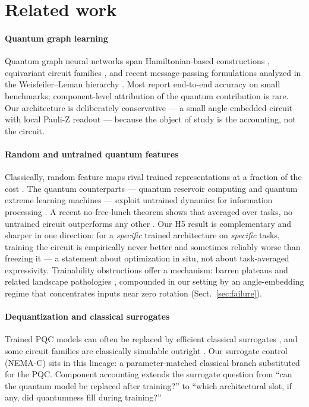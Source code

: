 \documentclass[pdflatex,sn-mathphys-num]{sn-jnl}
\begin{document}
\section{Related work}\label{sec:related}

\paragraph{Quantum graph learning} Quantum graph neural networks span Hamiltonian-based constructions \cite{verdon2019qgnn}, equivariant circuit families \cite{mernyei2022equivariant}, and recent message-passing formulations analyzed in the Weisfeiler--Leman hierarchy \cite{mpqgnn2026wl}. Most report end-to-end accuracy on small benchmarks; component-level attribution of the quantum contribution is rare. Our architecture is deliberately conservative --- a small angle-embedded circuit with local Pauli-Z readout \cite{benedetti2019pqc,schuld2019feature} --- because the object of study is the accounting, not the circuit.

\paragraph{Random and untrained quantum features} Classically, random feature maps rival trained representations at a fraction of the cost \cite{rahimi2007random}. The quantum counterparts --- quantum reservoir computing and quantum extreme learning machines --- exploit untrained dynamics for information processing \cite{fujii2017qrc,mujal2021qrc,innocenti2023qelm,qelm2025scrambling}. A recent no-free-lunch theorem shows that averaged over tasks, no untrained circuit outperforms any other \cite{herbert2023nfl}. Our H5 result is complementary and sharper in one direction: for a \emph{specific} trained architecture on \emph{specific} tasks, training the circuit is empirically never better and sometimes reliably worse than freezing it --- a statement about optimization in situ, not about task-averaged expressivity. Trainability obstructions offer a mechanism: barren plateaus and related landscape pathologies \cite{mcclean2018barren,cerezo2021cost,holmes2022expressibility,larocca2025barren}, compounded in our setting by an angle-embedding regime that concentrates inputs near zero rotation (Sect.~\ref{sec:failure}).

\paragraph{Dequantization and classical surrogates} Trained PQC models can often be replaced by efficient classical surrogates \cite{tang2019dequant,schreiber2023surrogates,sweke2025rff,shin2024tensor}, and some circuit families are classically simulable outright \cite{qcnn2024simulable}. Our surrogate control (NEMA-C) sits in this lineage: a parameter-matched classical branch substituted for the PQC. Component accounting extends the surrogate question from ``can the quantum model be replaced after training?'' to ``which architectural slot, if any, did quantumness fill during training?''
\end{document}
